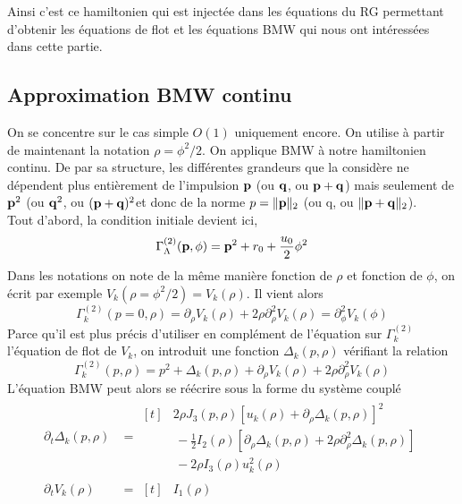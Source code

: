 \documentclass[10pt]{article}
\begin{document}
\begin{multicols}{2}
Ainsi c'est ce hamiltonien qui est injectée dans les équations du RG permettant d'obtenir les équations de flot et les équations BMW qui nous ont intéressées dans cette partie.


\vspace*{11pt}

\subsection{Approximation BMW continu}


\vspace*{11pt}
On se concentre sur le cas simple $O(1)$ uniquement encore.
On utilise à partir de maintenant la notation $\rho = \phi^2/2$. On applique BMW à notre hamiltonien continu. De par sa structure, les différentes grandeurs que la considère ne dépendent plus entièrement de l'impulsion ${\bf p}$ (ou ${\bf q}$, ou ${\bf p}+{\bf q}$) mais seulement de ${\bf p}^2$ (ou ${\bf q}^2$, ou $({\bf p}+{\bf q})^2$et donc de la norme $p = \| {\bf p} \|_{2}$ (ou q, ou $\|{\bf p}+{\bf q}\|_2$). \\

Tout d'abord, la condition initiale  devient ici,
\begin{equation}
	\Gamma^{(2)}_\Lambda({\bf p}, \phi) = {\bf p}^2 + r_0 + \frac{u_0}{2} \phi^2
	\label{eq:initBMWCont}
\end{equation}
Dans les notations on note de la même manière fonction de $\rho$ et fonction de $\phi$, on écrit par exemple $V_k(\rho = \phi^2/2) = V_k(\rho)$. Il vient alors
\begin{equation}
	\Gamma^{(2)}_k(p=0, \rho) = \partial_{\rho}V_k(\rho) + 2\rho\partial_{\rho}^2 V_k(\rho) = \partial_{\phi}^2 V_k(\phi)
\end{equation}
Parce qu'il est plus précis d'utiliser en complément de l'équation sur $\Gamma^{(2)}_k$ l'équation de flot de $V_k$, on introduit une fonction $\Delta_k(p, \rho)$ vérifiant la relation
\begin{equation}
	\Gamma^{(2)}_k(p, \rho) = p^2 + \Delta_k(p, \rho) + \partial_{\rho}V_k(\rho) + 2\rho\partial_{\rho}^2 V_k(\rho) 
	\label{eq:gammaDecomp}
\end{equation}
L'équation BMW  peut alors se réécrire sous la forme du système couplé
\begin{align}
	\partial_t \Delta_k(p, \rho) & = 
	\begin{aligned}[t]
	 & 2\rho J_3(p,\rho){\left[u_k(\rho) + \partial_\rho \Delta_k (p,\rho) \right]}^{2} \\
	  & \, - \frac{1}{2}I_2(\rho) \left[\partial_\rho \Delta_k(p, \rho) +  2\rho \partial_\rho^2 \Delta_k(p,\rho) \right] \\
	 & \, - 2\rho I_3 (\rho) u_k^2(\rho) 
	 \end{aligned}
	\label{eqn:sysDeltaON1}\\
	\partial_t V_k(\rho) & = 
	\begin{aligned}[t]
		& I_1(\rho)
	\end{aligned}
	\label{eqn:sysDeltaON2}
\end{align}


\end{multicols}
\end{document}
